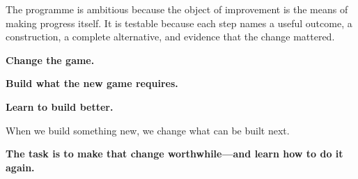 The programme is ambitious because the object of improvement is the means of making progress itself. It is testable because each step names a useful outcome, a construction, a complete alternative, and evidence that the change mattered.

\begin{thesisbox}
{\Large\bfseries\color{Plum}Change the game.}\par
{\Large\bfseries\color{Plum}Build what the new game requires.}\par
{\Large\bfseries\color{Plum}Learn to build better.}\par\medskip
When we build something new, we change what can be built next.\par
\textbf{The task is to make that change worthwhile---and learn how to do it again.}
\end{thesisbox}
